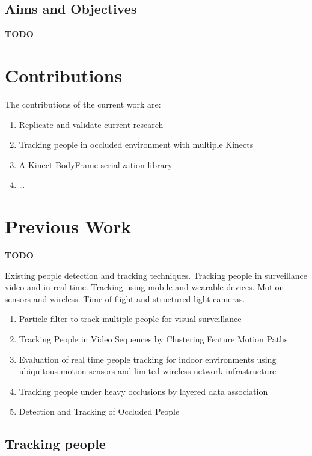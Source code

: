 \documentclass{sigchi}
\begin{document}
\subsection{Aims and Objectives}

\textbf{TODO}

\section{Contributions}
\label{sec:contributions}

The contributions of the current work are:

\begin{enumerate}
  \item Replicate and validate current research
  \item Tracking people in occluded environment with multiple Kinects
  \item A Kinect BodyFrame serialization library
  \item \dots
\end{enumerate}

\section{Previous Work}
\label{sec:previous_work}

\textbf{TODO}

Existing people detection and tracking techniques. Tracking people in surveillance video and in real time. Tracking using mobile and wearable devices. Motion sensors and wireless. Time-of-flight and structured-light cameras.

\begin{enumerate}
  \item Particle filter to track multiple people for visual surveillance
  \item Tracking People in Video Sequences by Clustering Feature Motion Paths
  \item Evaluation of real time people tracking for indoor environments using ubiquitous motion sensors and limited wireless network infrastructure
  \item Tracking people under heavy occlusions by layered data association
  \item Detection and Tracking of Occluded People
\end{enumerate}

\subsection{Tracking people}
\end{document}
